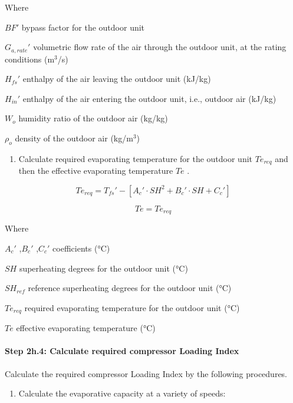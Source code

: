 Where

\(BF'\) bypass factor for the outdoor unit

\({G_{a,rate}}'\) volumetric flow rate of the air through the outdoor unit, at the rating conditions (m\(^{3}\)/s)

\({H_{fs}}'\) enthalpy of the air leaving the outdoor unit (kJ/kg)

\({H_{in}}'\) enthalpy of the air entering the outdoor unit, i.e., outdoor air (kJ/kg)

\(W_o\) humidity ratio of the outdoor air (kg/kg)

\(\rho_o\) density of the outdoor air (kg/m\(^{3}\))

\begin{enumerate}
\def\labelenumi{(\arabic{enumi})}
\setcounter{enumi}{1}
\tightlist
\item
  Calculate required evaporating temperature for the outdoor unit \(Te_{req}\) and then the effective evaporating temperature \(Te\) .
\end{enumerate}

\begin{equation}
Te_{req} = {T_{fs}}'-[{A_c}'\cdot SH^2+{B_c}'\cdot SH+{C_c}']
\end{equation}

\begin{equation}
Te = Te_{req}
\end{equation}

Where

\({A_c}'\) ,\({B_c}'\) ,\({C_c}'\) coefficients (°C)

\(SH\) superheating degrees for the outdoor unit (°C)

\(SH_{ref}\) reference superheating degrees for the outdoor unit (°C)

\(Te_{req}\) required evaporating temperature for the outdoor unit (°C)

\(Te\) effective evaporating temperature (°C)

\paragraph{Step 2h.4: Calculate required compressor Loading Index}\label{step-2h.4-calculate-required-compressor-loading-index}

Calculate the required compressor Loading Index by the following procedures.

\begin{enumerate}
\def\labelenumi{\alph{enumi}.}
\tightlist
\item
  Calculate the evaporative capacity at a variety of speeds:
\end{enumerate}

